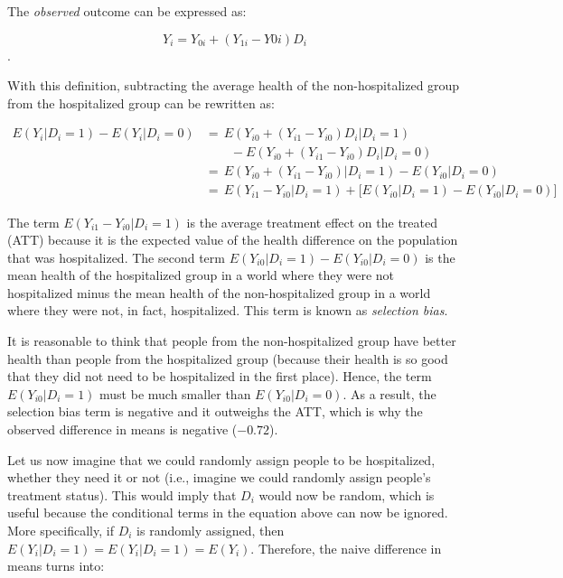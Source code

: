 \documentclass[12pt]{article}
\begin{document}
The \textit{observed} outcome can be expressed as:

\begin{equation*}
    Y_i = Y_{0i} + (Y_{1i} - Y{0i}) D_i
\end{equation*}.

With this definition, subtracting the average health of the non-hospitalized
group from the hospitalized group can be rewritten as:

\begin{equation*}
    \begin{split}
        E(Y_i | D_i = 1) - E(Y_i | D_i = 0)
            & = \, E(Y_{i0} + (Y_{i1} - Y_{i0}) D_i | D_i = 1) \\
            & \qquad - E(Y_{i0} + (Y_{i1} - Y_{i0}) D_i | D_i = 0) \\
            & = \, E(Y_{i0} + (Y_{i1} - Y_{i0}) | D_i = 1)
                - E(Y_{i0} | D_i = 0) \\
            & = \, E(Y_{i1} - Y_{i0} | D_i = 1)
            + \big[ E(Y_{i0} | D_i = 1) - E(Y_{i0} | D_i = 0) \big]
    \end{split}
\end{equation*}

The term $E(Y_{i1} - Y_{i0} | D_i = 1)$ is the average treatment effect on the
treated (ATT) because it is the expected value of the health difference on the
population that was hospitalized. The second term
$E(Y_{i0} | D_i = 1) - E(Y_{i0} | D_i = 0)$ is the mean health of the
hospitalized group in a world where they were not hospitalized minus the mean
health of the non-hospitalized group in a world where they were not, in fact,
hospitalized. This term is known as \textit{selection bias}.

It is reasonable to think that people from the non-hospitalized group have
better health than people from the hospitalized group (because their health is
so good that they did not need to be hospitalized in the first place). Hence,
the term $E(Y_{i0} | D_i = 1)$ must be much smaller than $E(Y_{i0} | D_i = 0)$.
As a result, the selection bias term is negative and it outweighs the ATT,
which is why the observed difference in means is negative ($-0.72$).

Let us now imagine that we could randomly assign people to be hospitalized,
whether they need it or not (i.e., imagine we could randomly assign people's
treatment status). This would imply that $D_i$ would now be random, which is
useful because the conditional terms in the equation above can now be ignored.
More specifically, if $D_i$ is randomly assigned, then
$E(Y_i | D_i = 1) = E(Y_i | D_i = 1) = E(Y_i)$. Therefore, the naive difference
in means turns into:
\end{document}
